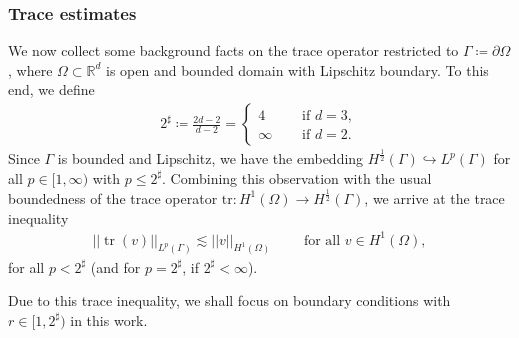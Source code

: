 \documentclass[reqno,a4paper]{amsart}
\def\norm#1{\left|\!\left| #1 \right|\!\right|}
\def\R{\mathbb{R}}
\def\tr{\mathop{\mathrm{tr}}\nolimits}
\begin{document}
	\subsubsection{Trace estimates}
	
	We now collect some background facts on the trace operator restricted to $\Gamma \coloneqq \partial\Omega$, where $\Omega\subset\R^{d}$ is open and bounded domain with Lipschitz boundary. 
	To this end, we define 
	\begin{align}\label{def:2-sharp}
		2^\sharp \coloneqq 
		\frac{2d-2}{d-2} =  \begin{cases}
			4 \quad &\text{ if } d = 3,\\
			\infty 	\quad &\text{ if } d = 2.
		\end{cases}
	\end{align}
	Since $\Gamma$ is bounded and Lipschitz, we have the embedding  $H^{\frac{1}{2}}(\Gamma) \hookrightarrow L^{p}(\Gamma)$ for all $p \in [1, \infty)$ with $p \leq 2^{\sharp}$. 
	Combining this observation with the usual boundedness of the trace operator $\mathrm{tr}\colon H^{1}(\Omega)\to H^{\frac{1}{2}}(\Gamma)$, we arrive at the trace inequality 
	\begin{align}\label{est:trace}
		\norm{\tr(v)}_{L^{p}(\Gamma)} \lesssim \norm{v}_{H^1(\Omega)} \qquad \text{ for all } v \in H^1(\Omega),
	\end{align}
	for all $p< 2^{\sharp}$ (and for $p = 2^\sharp$, if $2^\sharp < \infty$). 
	
	Due to this trace inequality, we shall focus on boundary conditions with $r \in [1,2^\sharp)$ in this work.
	
\end{document}
